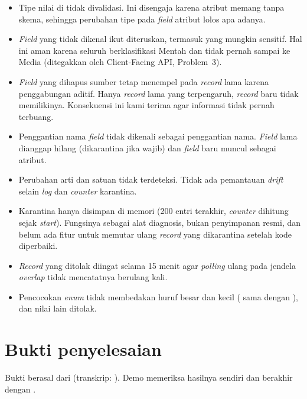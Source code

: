 \begin{itemize}
 \item Tipe nilai di  tidak divalidasi. Ini disengaja karena atribut memang tanpa skema, sehingga perubahan tipe pada \emph{field} atribut lolos apa adanya.
 \item \emph{Field} yang tidak dikenal ikut diteruskan, termasuk yang mungkin sensitif. Hal ini aman karena seluruh  berklasifikasi Mentah dan tidak pernah sampai ke Media (ditegakkan oleh Client-Facing API, Problem~3).
 \item \emph{Field} yang dihapus sumber tetap menempel pada \emph{record} lama karena penggabungan aditif. Hanya \emph{record} lama yang terpengaruh, \emph{record} baru tidak memilikinya. Konsekuensi ini kami terima agar informasi tidak pernah terbuang.
 \item Penggantian nama \emph{field} tidak dikenali sebagai penggantian nama. \emph{Field} lama dianggap hilang (dikarantina jika wajib) dan \emph{field} baru muncul sebagai atribut.
 \item Perubahan arti dan satuan tidak terdeteksi. Tidak ada pemantauan \emph{drift} selain \emph{log} dan \emph{counter} karantina.
 \item Karantina hanya disimpan di memori (200 entri terakhir, \emph{counter} dihitung sejak \emph{start}). Fungsinya sebagai alat diagnosis, bukan penyimpanan resmi, dan belum ada fitur untuk memutar ulang \emph{record} yang dikarantina setelah kode diperbaiki.
 \item \emph{Record} yang ditolak diingat selama 15 menit agar \emph{polling} ulang pada jendela \emph{overlap} tidak mencatatnya berulang kali.
 \item Pencocokan \emph{enum} tidak membedakan huruf besar dan kecil ( sama dengan ), dan nilai lain ditolak.
\end{itemize}

\section{Bukti penyelesaian}

Bukti berasal dari  (transkrip: ). Demo memeriksa hasilnya sendiri
dan berakhir dengan .

